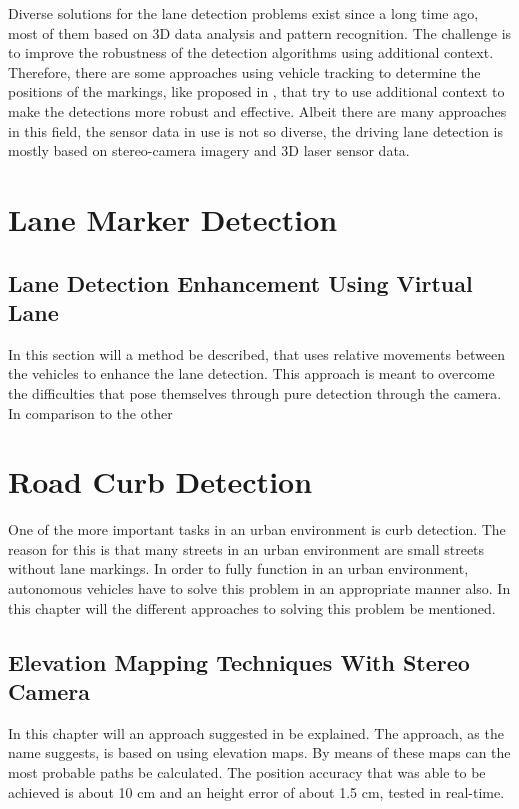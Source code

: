 \documentclass[conference]{IEEEtran}
\begin{document}
Diverse solutions for the lane detection problems exist since a long time ago, most of them based on 3D data analysis and pattern recognition. The challenge is to improve the robustness of the detection algorithms using additional context. Therefore, there are some approaches using vehicle tracking to determine the positions of the markings, like proposed in \cite{virtuallane}, that try to use additional context to make the detections more robust and effective. Albeit there are many approaches in this field, the sensor data in use is not so diverse, the driving lane detection is mostly based on stereo-camera imagery and 3D laser sensor data.


\section{Lane Marker Detection}

\subsection{Lane Detection Enhancement Using Virtual Lane}

In this section will a method be described, that uses relative movements between the vehicles to enhance the lane detection. This approach is meant to overcome the difficulties that pose themselves through pure detection through the camera. In comparison to the other  



\section{Road Curb Detection}

One of the more important tasks in an urban environment is curb detection. The reason for this is that many streets in an urban environment are small streets without lane markings. In order to fully function in an urban environment, autonomous vehicles have to solve this problem in an appropriate manner also. In this chapter will the different approaches to solving this problem be mentioned.  

\subsection{Elevation Mapping Techniques With Stereo Camera}

In this chapter will an approach suggested in \cite{stereo} be explained. The approach, as the name suggests, is based on using elevation maps. By means of these maps can the most probable paths be calculated. The position accuracy that was able to be achieved is about 10 cm and an height error of about 1.5 cm, tested in real-time.
\end{document}
